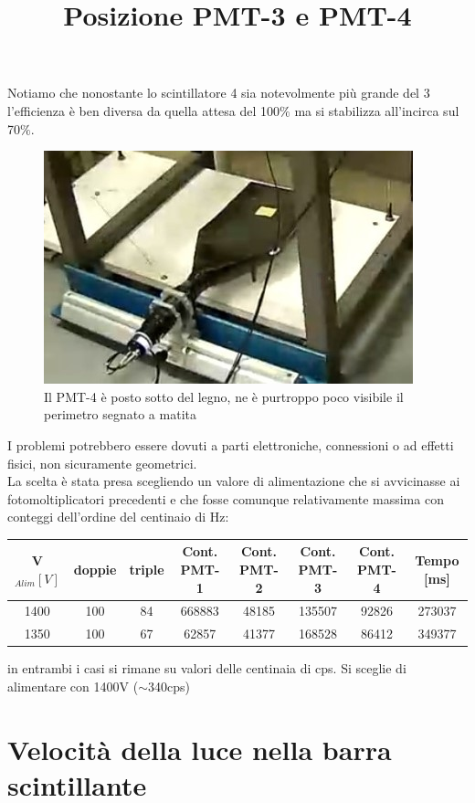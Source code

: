 \documentclass[a4paper]{article}
\begin{document}
Notiamo che nonostante lo scintillatore 4 sia notevolmente più grande del 3 l'efficienza è ben diversa da quella attesa del 100$\%$ ma si stabilizza all'incirca sul 70$\%$.

\begin{figure}[H]
\centering
\title{Posizione PMT-3 e PMT-4}
\begin{center}
\includegraphics[scale=0.4]{./immagini/TimeOfFlight/CalPMT4app.jpg}
\caption{Il PMT-4 è posto sotto del legno, ne è purtroppo poco visibile il perimetro segnato a matita}
\label{fig:PMT3posPMT4}
\end{center}
\end{figure}

I problemi potrebbero essere dovuti a parti elettroniche, connessioni o ad effetti fisici, non sicuramente geometrici.\\
La scelta è stata presa scegliendo un valore di alimentazione che si avvicinasse ai fotomoltiplicatori precedenti e che fosse comunque relativamente massima con conteggi dell'ordine del centinaio di Hz:

\begin{tabular}{|c|c|c|c|c|c|c|c|}
\hline
V$_{Alim} [V]$ & doppie & triple & Cont. PMT-1 & Cont. PMT-2 & Cont. PMT-3 & Cont. PMT-4 & Tempo [ms]\\
\hline
1400 & 100 & 84 & 668883 & 48185 & 135507 & 92826 & 273037\\
\hline
1350 & 100 & 67 & 62857 & 41377 & 168528 & 86412 & 349377\\
\hline
\end{tabular}

in entrambi i casi si rimane su valori delle centinaia di cps. Si sceglie di alimentare con 1400V  ($\sim$340cps)

\section{Velocità della luce nella barra scintillante}
\label{sec:VLuce}
\end{document}
